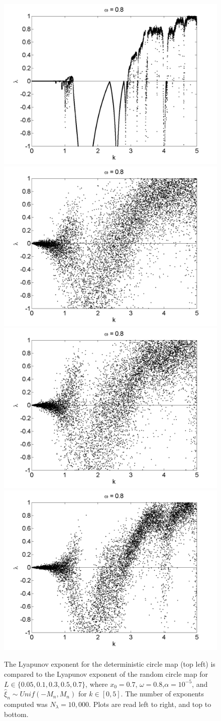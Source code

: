\begin{figure}[!h]
\caption[Lyapunov exponent in the random circle map (uniform distribution) compared to the
deterministic map, varying $k$]{The Lyapunov exponent for the deterministic
  circle map (top left) is compared to the Lyapunov exponent of the random circle map for $L \in \{0.05,0.1,0.3,0.5,0.7\}$, where $x_0=0.7$, $\omega=0.8$,$\alpha = 10^{-5}$, and $\hat{\xi}_n\sim Unif(-M_n,M_n)$ for $k \in [0,5]$. The number of exponents computed was $N_\lambda=10,000$. Plots are read left to right, and top to bottom. }\label{fig:rloglyap2_u}
\centering
\includegraphics[width=.5\textwidth]{figs/detcirc_n_lyap_10000_w_08_k.png}\hfill
\includegraphics[width=.5\textwidth]{figs/rcirc_u_lyap_10000_L_005_w_08_k.png}\\
\includegraphics[width=.5\textwidth]{figs/rcirc_u_lyap_10000_L_01_w_08_k.png}\hfill
\includegraphics[width=.5\textwidth]{figs/rcirc_u_lyap_10000_L_03_w_08_k.png}\\

\end{figure}
